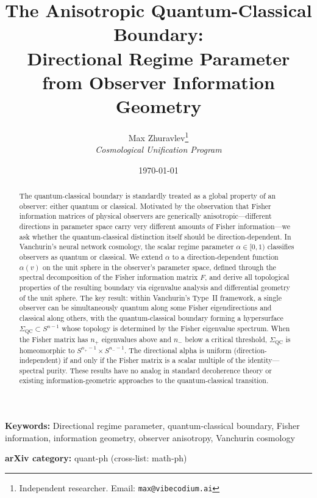 \documentclass[11pt,a4paper]{article}
\title{\textbf{The Anisotropic Quantum-Classical Boundary:} \\[0.3em]
\large Directional Regime Parameter from Observer Information Geometry}
\author{
Max Zhuravlev\thanks{Independent researcher. Email: \texttt{max@vibecodium.ai}} \\
\small \textit{Cosmological Unification Program}
}
\date{\today}
\theoremstyle{plain}
\theoremstyle{definition}
\newcommand{\Sn}{S^{n-1}}
\newcommand{\SigmaQC}{\Sigma_{\mathrm{QC}}}
\begin{document}
\maketitle


\begin{abstract}
The quantum-classical boundary is standardly treated as a global property
of an observer: either quantum or classical.  Motivated by the observation
that Fisher information matrices of physical observers are generically
anisotropic---different directions in parameter space carry very different
amounts of Fisher information---we ask whether the quantum-classical
distinction itself should be direction-dependent.
In Vanchurin's neural network cosmology, the scalar regime parameter
$\alpha \in [0,1)$ classifies observers as quantum or classical.
We extend $\alpha$ to a direction-dependent function $\alpha(v)$ on
the unit sphere in the observer's parameter space, defined through
the spectral decomposition of the Fisher information matrix $F$,
and derive all topological properties of the resulting boundary
via eigenvalue analysis and differential geometry of the unit sphere.
The key result: within Vanchurin's Type~II framework,
a single observer can be simultaneously quantum
along some Fisher eigendirections and classical along others,
with the quantum-classical boundary forming a hypersurface
$\SigmaQC \subset \Sn$ whose topology is determined by the
Fisher eigenvalue spectrum.  When the Fisher matrix has $n_+$
eigenvalues above and $n_-$ below a critical threshold,
$\SigmaQC$ is homeomorphic to $S^{n_+-1} \times S^{n_--1}$.
The directional alpha is uniform (direction-independent)
if and only if the Fisher matrix is a scalar multiple of the
identity---spectral purity.  These results have no analog
in standard decoherence theory or existing information-geometric
approaches to the quantum-classical transition.
\end{abstract}

\noindent\textbf{Keywords:} Directional regime parameter, quantum-classical
boundary, Fisher information, information geometry, observer anisotropy,
Vanchurin cosmology

\vspace{1em}
\noindent\textbf{arXiv category:} quant-ph (cross-list: math-ph)

\end{document}
